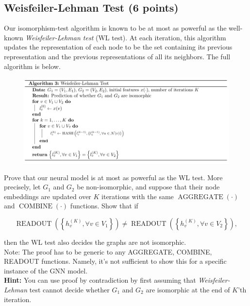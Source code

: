 \documentclass{article}
\numberwithin{figure}{section}
\begin{document}
\subsection{Weisfeiler-Lehman Test (6 points)}
Our isomorphism-test algorithm is known to be at most as powerful as the well-known \textit{Weisfeiler-Lehman test} (WL test). At each iteration, this algorithm updates the representation of each node to be the set containing its previous representation and the previous representations of all its neighbors. The full algorithm is below.

    \begin{figure}[H]
        \centering
        \includegraphics[width=1.0\textwidth]{CS224W_Homework1/algo-3.png}
        \label{fig:my_label}
    \end{figure}


    Prove that our neural model is at most as powerful as the WL test. More precisely, let $G_1$ and $G_2$ be non-isomorphic, and suppose that their node embeddings are updated over $K$ iterations with the same $\operatorname{AGGREGATE}(\cdot)$ and $\operatorname{COMBINE}(\cdot)$ functions. Show that if

    $$\operatorname { READOUT }\left(\left\{h_v^{(K)}, \forall v \in V_1\right\}\right) \neq \operatorname { READOUT }\left(\left\{h_v^{(K)}, \forall v \in V_2\right\}\right),$$

then the WL test also decides the graphs are not isomorphic.\\

Note: The proof has to be generic to any AGGREGATE, COMBINE, READOUT functions. Namely, it's not sufficient to show this for a specific instance of the GNN model.\\

\textbf{Hint:} You can use proof by contradiction by first assuming that \textit{Weisfeiler-Lehman} test cannot decide whether $G_1$ and $G_2$ are isomorphic at the end of $K$’th iteration.
\end{document}
